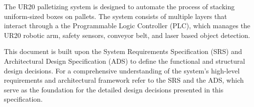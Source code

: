 

The UR20 palletizing system is designed to automate the process of stacking uniform-sized boxes on pallets. The system consists of multiple layers that interact through a the Programmable Logic Controller (PLC), which manages the UR20 robotic arm, safety sensors, conveyor belt, and laser based object detection. 

This document is built upon the System Requirements Specification (SRS) and Architectural Design Specification (ADS) to define the functional and structural design decisions. For a comprehensive understanding of the system's high-level requirements and architectural framework refer to the SRS and the ADS, which serve as the foundation for the detailed design decisions presented in this specification.
